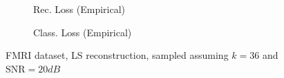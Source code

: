 \begin{figure}[h!btp]%
    \centering

    \begin{subfigure}[T]{0.45\columnwidth}
    \caption{Rec. Loss (Empirical)}%
    \label{subfig:fmri_LS_rec}
    \end{subfigure}
    \begin{subfigure}[T]{0.45\columnwidth}
    \caption{Class. Loss (Empirical)}
    \label{subfig:fmri_noiseless_sgc_LS_class_anal}
    \end{subfigure}%
    \caption{FMRI dataset, LS reconstruction, sampled assuming $k=36$ and $\text{SNR} = 20dB$}
\label{fig:fmri}
\end{figure}


